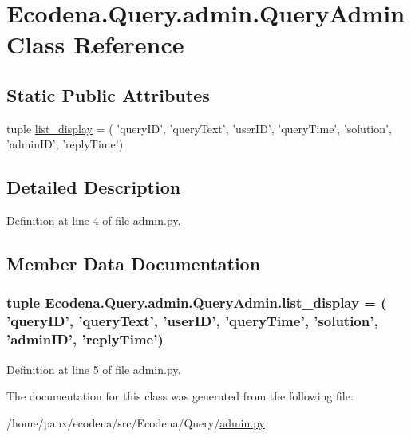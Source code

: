 \hypertarget{class_ecodena_1_1_query_1_1admin_1_1_query_admin}{
\section{Ecodena.Query.admin.QueryAdmin Class Reference}
\label{d4/df7/class_ecodena_1_1_query_1_1admin_1_1_query_admin}
}
\subsection*{Static Public Attributes}
\begin{DoxyCompactItemize}
\item 
tuple \hyperlink{class_ecodena_1_1_query_1_1admin_1_1_query_admin_a5311f3ccc7cc422a4e273f095a22a45d}{list\_\-display} = ( 'queryID', 'queryText', 'userID', 'queryTime', 'solution', 'adminID', 'replyTime')
\end{DoxyCompactItemize}


\subsection{Detailed Description}


Definition at line 4 of file admin.py.



\subsection{Member Data Documentation}
\hypertarget{class_ecodena_1_1_query_1_1admin_1_1_query_admin_a5311f3ccc7cc422a4e273f095a22a45d}{
\subsubsection[{list\_\-display}]{\setlength{\rightskip}{0pt plus 5cm}tuple {\bf Ecodena.Query.admin.QueryAdmin.list\_\-display} = ( 'queryID', 'queryText', 'userID', 'queryTime', 'solution', 'adminID', 'replyTime')}}
\label{d4/df7/class_ecodena_1_1_query_1_1admin_1_1_query_admin_a5311f3ccc7cc422a4e273f095a22a45d}


Definition at line 5 of file admin.py.



The documentation for this class was generated from the following file:\begin{DoxyCompactItemize}
\item 
/home/panx/ecodena/src/Ecodena/Query/\hyperlink{_query_2admin_8py}{admin.py}\end{DoxyCompactItemize}
